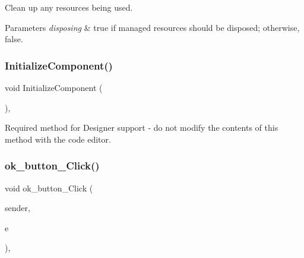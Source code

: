 Clean up any resources being used. 


\begin{DoxyParams}{Parameters}
{\em disposing} & true if managed resources should be disposed; otherwise, false.\\
\hline
\end{DoxyParams}
\mbox{\label{classWildlifeTrackingApp_1_1PopUp_a6405d5db675d5338663195a4d12b4c9f}} 
\subsubsection{\texorpdfstring{Initialize\+Component()}{InitializeComponent()}}
{\footnotesize\ttfamily void Initialize\+Component (\begin{DoxyParamCaption}{ }\end{DoxyParamCaption})\hspace{0.3cm}{\ttfamily [inline]}, {\ttfamily [private]}}



Required method for Designer support -\/ do not modify the contents of this method with the code editor. 

\mbox{\label{classWildlifeTrackingApp_1_1PopUp_aacb4f2fe113c4f620d97ffae6a93d313}} 
\subsubsection{\texorpdfstring{ok\+\_\+button\+\_\+\+Click()}{ok\_button\_Click()}}
{\footnotesize\ttfamily void ok\+\_\+button\+\_\+\+Click (\begin{DoxyParamCaption}\item[{object}]{sender,  }\item[{Event\+Args}]{e }\end{DoxyParamCaption})\hspace{0.3cm}{\ttfamily [inline]}, {\ttfamily [private]}}



